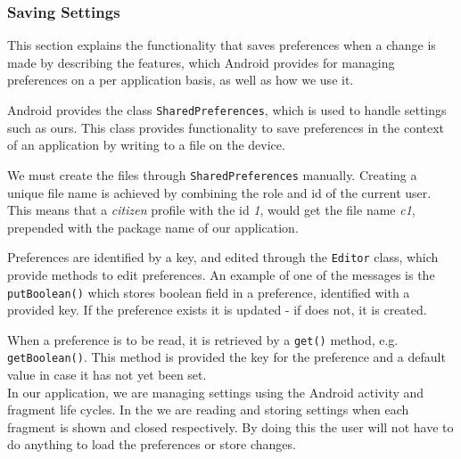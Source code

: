 \subsubsection{Saving Settings}\label{para:sprint4:managingsettingsandroid}
This section explains the functionality that saves preferences when a change is made by describing the features, which Android provides for managing preferences on a per application basis, as well as how we use it.

Android provides the class \lstinline|SharedPreferences|, which is used to handle settings such as ours.
This class provides functionality to save preferences in the context of an application by writing to a file on the device.

We must create the files through \lstinline|SharedPreferences| manually.
Creating a unique file name is achieved by combining the role and id of the current user.
This means that a \textit{citizen} profile with the id \textit{1}, would get the file name \textit{c1}, prepended with the package name of our application.

Preferences are identified by a key, and edited through the \lstinline|Editor| class, which provide methods to edit preferences.
An example of one of the messages is the \lstinline!putBoolean()! which stores boolean field in a preference, identified with a provided key.
If the preference exists it is updated - if does not, it is created.

When a preference is to be read, it is retrieved by a \lstinline|get()| method, e.g. \lstinline!getBoolean()!.
This method is provided the key for the preference and a default value in case it has not yet been set.\\

In our application, we are managing settings using the Android activity and fragment life cycles.
In the \settingsactivity we are reading and storing settings when each fragment is shown and closed respectively. 
By doing this the user will not have to do anything to load the preferences or store changes.